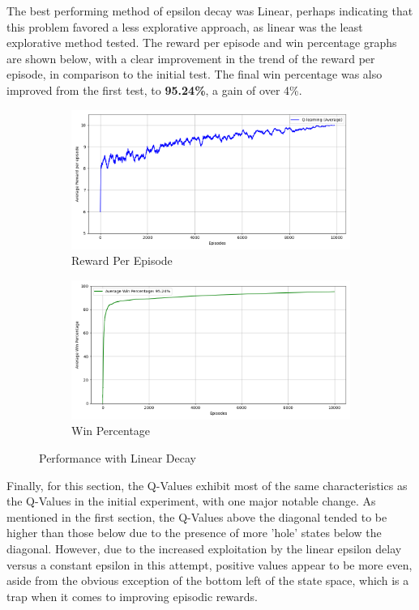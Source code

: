 \documentclass[a4paper,9pt]{scrartcl}
\begin{document}
The best performing method of epsilon decay was Linear, perhaps indicating that this problem favored a less explorative approach, as linear was the least
explorative method tested. The reward per episode and win percentage graphs are shown below, with a clear improvement in the trend of the reward per episode, 
in comparison to the initial test. The final win percentage was also improved from the first test, to \textbf{95.24\%}, a gain of over 4\%.

\begin{figure}[H]
\centering
\begin{subfigure}[b]{0.45\textwidth}
\includegraphics[width=\textwidth]{images/q_learning_rewards_avg(2)(0).png}
\caption{Reward Per Episode}
\label{fig:decay_rewards}
\end{subfigure}
\hfill
\begin{subfigure}[b]{0.45\textwidth}
\includegraphics[width=\textwidth]{images/q_learning_win_percentage_avg(2)(0).png}
\caption{Win Percentage}
\label{fig:decay_winpercent}
\end{subfigure}
\caption{Performance with Linear Decay}
\label{fig:decay_performance}
\end{figure}

Finally, for this section, the Q-Values exhibit most of the same characteristics as the Q-Values in the initial experiment, with one major notable
change. As mentioned in the first section, the Q-Values above the diagonal tended to be higher than those below due to the presence of more 'hole' 
states below the diagonal. However, due to the increased exploitation by the linear epsilon delay versus a constant epsilon in this attempt, positive
values appear to be more even, aside from the obvious exception of the bottom left of the state space, which is a trap when it comes to 
improving episodic rewards.
\end{document}

